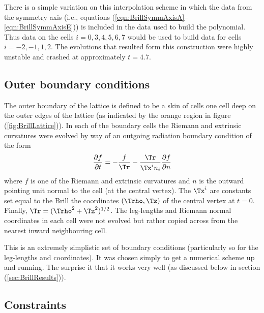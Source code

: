 \documentclass[a4paper,12pt]{article}
\numberwithin{equation}{section}
\begin{document}
There is a simple variation on this interpolation scheme in which the data from the symmetry
axis (i.e., equations (\ref{eqn:BrillSymmAxisA}--\ref{eqn:BrillSymmAxisE})) is included in
the data used to build the polynomial. Thus data on the cells $i=0,3,4,5,6,7$ would be used
to build data for cells $i=-2,-1,1,2$. The evolutions that resulted form this construction
were highly unstable and crashed at approximately $t=4.7$.

\subsection{Outer boundary conditions}
\label{sec:BrillOuterBCs}

The outer boundary of the lattice is defined to be a skin of cells one cell deep on the outer
edges of the lattice (as indicated by the orange region in figure (\ref{fig:BrillLattice})).
In each of the boundary cells the Riemann and extrinsic curvatures were evolved by way of an
outgoing radiation boundary condition of the form
\begin{align}
   \label{eqn:BrillOuterBC}
   \frac{\partial f}{\partial t}
   =
   - \frac{f}{\Tr}
   - \frac{\Tr}{\Tx^i n_i}\frac{\partial f}{\partial n}
\end{align}
where $f$ is one of the Riemann and extrinsic curvatures and $n$ is the outward pointing unit
normal to the cell (at the central vertex). The $\Tx^i$ are constants set equal to the
Brill the coordinates $(\Trho,\Tz)$ of the central vertex at $t=0$. Finally,
$\Tr=(\Trho^2+\Tz^2)^{1/2}$. The leg-lengths and Riemann normal coordinates in each cell were
not evolved but rather copied across from the nearest inward neighbouring cell.

This is an extremely simplistic set of boundary conditions (particularly so for the
leg-lengths and coordinates). It was chosen simply to get a numerical scheme up and running.
The surprise it that it works very well (as discussed below in section
(\ref{sec:BrillResults})).

\subsection{Constraints}
\label{sec:BrillConstraints}
\end{document}
